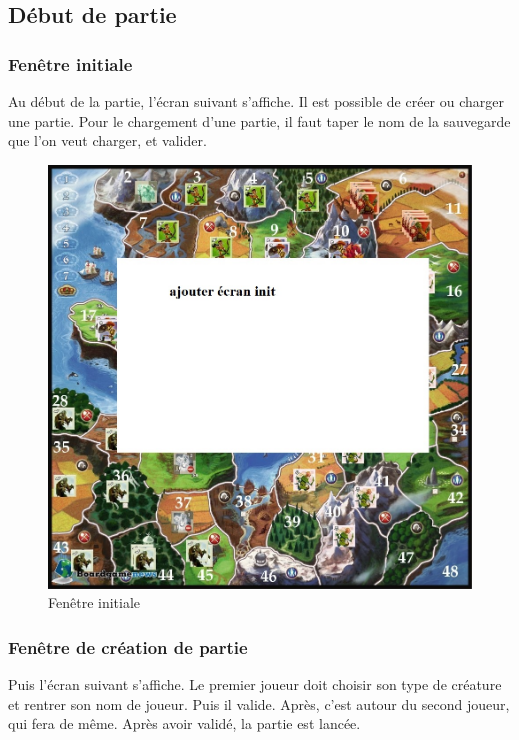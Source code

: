 \subsection{Début de partie}

\subsubsection{Fenêtre initiale}
Au début de la partie, l'écran suivant s'affiche. Il est possible de créer ou charger une partie. Pour le chargement d'une partie, il faut taper le nom de la sauvegarde que l'on veut charger, et valider.

\begin{figure}[ht!]
\centering
\includegraphics[scale=0.40]{img/init.jpg}
\caption{Fenêtre initiale}
\end{figure}
\newpage

\subsubsection{Fenêtre de création de partie}
Puis l'écran suivant s'affiche. Le premier joueur doit choisir son type de créature et rentrer son nom de joueur. Puis il valide. Après, c'est autour du second joueur, qui fera de même. Après avoir validé, la partie est lancée.

